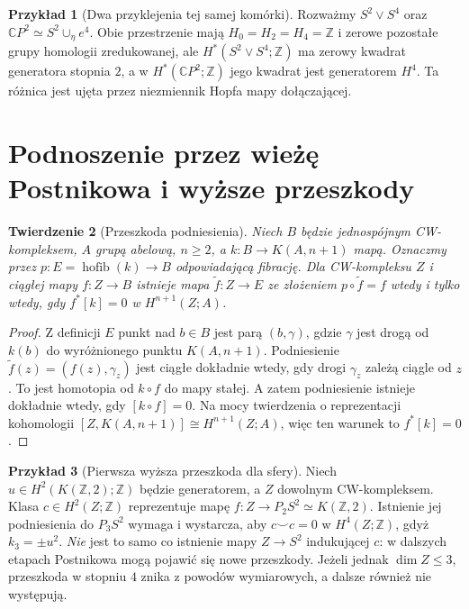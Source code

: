 \documentclass[11pt,a4paper,oneside]{report}
\newcommand{\C}{\mathbb{C}}
\newcommand{\Z}{\mathbb{Z}}
\theoremstyle{plain}
\newtheorem{twierdzenie}{Twierdzenie}[section]
\theoremstyle{definition}
\newtheorem{przyklad}[twierdzenie]{Przykład}
\theoremstyle{remark}
\begin{document}
\begin{przyklad}[Dwa przyklejenia tej samej komórki]
Rozważmy $S^2\vee S^4$ oraz
$\C P^2\simeq S^2\cup_{\eta}e^4$.
Obie przestrzenie mają $H_0=H_2=H_4=\Z$ i zerowe
pozostałe grupy homologii zredukowanej, ale
$H^*(S^2\vee S^4;\Z)$ ma zerowy kwadrat generatora
stopnia $2$, a w $H^*(\C P^2;\Z)$ jego kwadrat
jest generatorem $H^4$. Ta różnica jest ujęta
przez niezmiennik Hopfa mapy dołączającej.
\end{przyklad}

\section{Podnoszenie przez wieżę Postnikowa i wyższe przeszkody}
\begin{twierdzenie}[Przeszkoda podniesienia]
\label{thm:postnikov-lift-v7}
Niech $B$ będzie jednospójnym CW-kompleksem, $A$
grupą abelową, $n\ge2$, a
$k:B\to K(A,n+1)$ mapą. Oznaczmy przez
$p:E=\operatorname{hofib}(k)\to B$ odpowiadającą
fibrację. Dla CW-kompleksu $Z$ i ciągłej mapy
$f:Z\to B$ istnieje mapa $\widetilde f:Z\to E$
ze złożeniem $p\circ\widetilde f=f$ wtedy i tylko
wtedy, gdy $f^*[k]=0$ w $H^{n+1}(Z;A)$.
\end{twierdzenie}
\begin{proof}
Z definicji $E$ punkt nad $b\in B$ jest parą
$(b,\gamma)$, gdzie $\gamma$ jest drogą od $k(b)$
do wyróżnionego punktu $K(A,n+1)$. Podniesienie
$\widetilde f(z)=(f(z),\gamma_z)$ jest ciągłe
dokładnie wtedy, gdy drogi $\gamma_z$ zależą
ciągle od $z$. To jest homotopia od $k\circ f$
do mapy stałej. A zatem podniesienie istnieje
dokładnie wtedy, gdy $[k\circ f]=0$.
Na mocy twierdzenia o reprezentacji kohomologii
$[Z,K(A,n+1)]\cong H^{n+1}(Z;A)$, więc ten
warunek to $f^*[k]=0$.
\end{proof}

\begin{przyklad}[Pierwsza wyższa przeszkoda dla sfery]
Niech $u\in H^2(K(\Z,2);\Z)$ będzie generatorem,
a $Z$ dowolnym CW-kompleksem. Klasa
$c\in H^2(Z;\Z)$ reprezentuje mapę
$f:Z\to P_2S^2\simeq K(\Z,2)$. Istnienie jej
podniesienia do $P_3S^2$ wymaga i wystarcza,
aby $c\smile c=0$ w $H^4(Z;\Z)$, gdyż
$k_3=\pm u^2$. \emph{Nie} jest to samo co
istnienie mapy $Z\to S^2$ indukującej $c$:
w dalszych etapach Postnikowa mogą pojawić się
nowe przeszkody. Jeżeli jednak $\dim Z\le3$,
przeszkoda w stopniu $4$ znika z powodów
wymiarowych, a dalsze również nie występują.
\end{przyklad}
\end{document}
